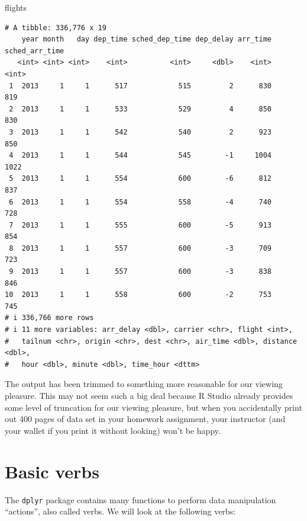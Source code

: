 \documentclass[
  letterpaper,
  DIV=11,
  numbers=noendperiod,
  oneside]{scrreprt}
\newenvironment{Shaded}{\begin{snugshade}}{\end{snugshade}}
\newcommand{\NormalTok}[1]{\textcolor[rgb]{0.00,0.23,0.31}{#1}}
\begin{document}
\begin{Shaded}
\begin{Highlighting}[]
\NormalTok{flights}
\end{Highlighting}
\end{Shaded}

\begin{verbatim}
# A tibble: 336,776 x 19
    year month   day dep_time sched_dep_time dep_delay arr_time sched_arr_time
   <int> <int> <int>    <int>          <int>     <dbl>    <int>          <int>
 1  2013     1     1      517            515         2      830            819
 2  2013     1     1      533            529         4      850            830
 3  2013     1     1      542            540         2      923            850
 4  2013     1     1      544            545        -1     1004           1022
 5  2013     1     1      554            600        -6      812            837
 6  2013     1     1      554            558        -4      740            728
 7  2013     1     1      555            600        -5      913            854
 8  2013     1     1      557            600        -3      709            723
 9  2013     1     1      557            600        -3      838            846
10  2013     1     1      558            600        -2      753            745
# i 336,766 more rows
# i 11 more variables: arr_delay <dbl>, carrier <chr>, flight <int>,
#   tailnum <chr>, origin <chr>, dest <chr>, air_time <dbl>, distance <dbl>,
#   hour <dbl>, minute <dbl>, time_hour <dttm>
\end{verbatim}

The output has been trimmed to something more reasonable for our viewing
pleasure. This may not seem such a big deal because R Studio already
provides some level of truncation for our viewing pleasure, but when you
accidentally print out 400 pages of data set in your homework
assignment, your instructor (and your wallet if you print it without
looking) won't be happy.

\section{Basic verbs}\label{basic-verbs}

The \texttt{dplyr} package contains many functions to perform data
manipulation ``actions'', also called verbs. We will look at the
following verbs:
\end{document}

